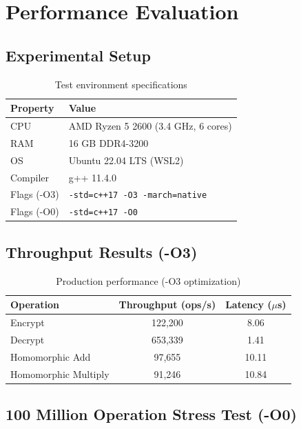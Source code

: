 \documentclass[11pt,a4paper]{article}
\theoremstyle{remark}
\begin{document}
\section{Performance Evaluation}

\subsection{Experimental Setup}

\begin{table}[H]
\centering
\begin{tabular}{ll}
\toprule
\textbf{Property} & \textbf{Value} \\
\midrule
CPU & AMD Ryzen 5 2600 (3.4 GHz, 6 cores) \\
RAM & 16 GB DDR4-3200 \\
OS & Ubuntu 22.04 LTS (WSL2) \\
Compiler & g++ 11.4.0 \\
Flags (-O3) & \texttt{-std=c++17 -O3 -march=native} \\
Flags (-O0) & \texttt{-std=c++17 -O0} \\
\bottomrule
\end{tabular}
\caption{Test environment specifications}
\end{table}

\subsection{Throughput Results (-O3)}

\begin{table}[H]
\centering
\begin{tabular}{lcc}
\toprule
\textbf{Operation} & \textbf{Throughput (ops/s)} & \textbf{Latency ($\mu$s)} \\
\midrule
Encrypt & 122,200 & 8.06 \\
Decrypt & 653,339 & 1.41 \\
Homomorphic Add & 97,655 & 10.11 \\
Homomorphic Multiply & 91,246 & 10.84 \\
\bottomrule
\end{tabular}
\caption{Production performance (-O3 optimization)}
\end{table}

\subsection{100 Million Operation Stress Test (-O0)}
\end{document}
